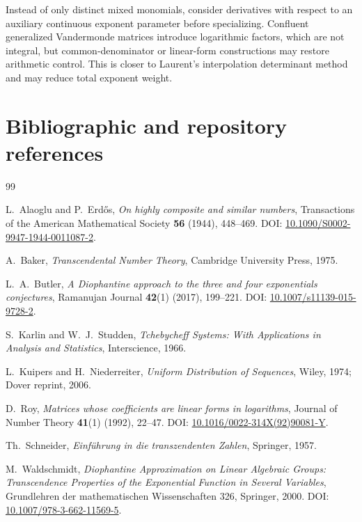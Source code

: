 \documentclass[11pt,oneside]{article}
\theoremstyle{definition}
\theoremstyle{remark}
\begin{document}
Instead of only distinct mixed monomials, consider derivatives with respect to an auxiliary
continuous exponent parameter before specializing.  Confluent generalized Vandermonde
matrices introduce logarithmic factors, which are not integral, but common-denominator or
linear-form constructions may restore arithmetic control.  This is closer to Laurent's
interpolation determinant method and may reduce total exponent weight.

\section{Bibliographic and repository references}
\label{app:references}

\begin{thebibliography}{99}

L.~Alaoglu and P.~Erd\H{o}s,
\newblock \emph{On highly composite and similar numbers},
\newblock Transactions of the American Mathematical Society \textbf{56} (1944), 448--469.
\newblock DOI: \href{https://doi.org/10.1090/S0002-9947-1944-0011087-2}{10.1090/S0002-9947-1944-0011087-2}.

A.~Baker,
\newblock \emph{Transcendental Number Theory},
\newblock Cambridge University Press, 1975.

L.~A.~Butler,
\newblock \emph{A Diophantine approach to the three and four exponentials conjectures},
\newblock Ramanujan Journal \textbf{42}(1) (2017), 199--221.
\newblock DOI: \href{https://doi.org/10.1007/s11139-015-9728-2}{10.1007/s11139-015-9728-2}.

S.~Karlin and W.~J.~Studden,
\newblock \emph{Tchebycheff Systems: With Applications in Analysis and Statistics},
\newblock Interscience, 1966.

L.~Kuipers and H.~Niederreiter,
\newblock \emph{Uniform Distribution of Sequences},
\newblock Wiley, 1974; Dover reprint, 2006.

D.~Roy,
\newblock \emph{Matrices whose coefficients are linear forms in logarithms},
\newblock Journal of Number Theory \textbf{41}(1) (1992), 22--47.
\newblock DOI: \href{https://doi.org/10.1016/0022-314X(92)90081-Y}{10.1016/0022-314X(92)90081-Y}.

Th.~Schneider,
\newblock \emph{Einf\"uhrung in die transzendenten Zahlen},
\newblock Springer, 1957.

M.~Waldschmidt,
\newblock \emph{Diophantine Approximation on Linear Algebraic Groups: Transcendence
Properties of the Exponential Function in Several Variables},
\newblock Grundlehren der mathematischen Wissenschaften 326, Springer, 2000.
\newblock DOI: \href{https://doi.org/10.1007/978-3-662-11569-5}{10.1007/978-3-662-11569-5}.


\end{thebibliography}
\end{document}
